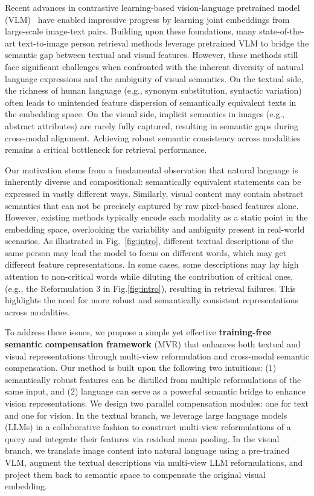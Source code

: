 
Recent advances in contrastive learning-based vision-language pretrained model (VLM)~\cite{radford2021learning, li2022blip} have enabled impressive progress by learning joint embeddings from large-scale image-text pairs. Building upon these foundations, many state-of-the-art text-to-image person retrieval methods \cite{HAM, zuo2024plip, hu2024empowering} leverage pretrained VLM to bridge the semantic gap between textual and visual features. However, these methods still face significant challenges when confronted with the inherent diversity of natural language expressions and the ambiguity of visual semantics. On the textual side, the richness of human language (e.g., synonym substitution, syntactic variation) often leads to unintended feature dispersion of semantically equivalent texts in the embedding space. On the visual side, implicit semantics in images (e.g., abstract attributes) are rarely fully captured, resulting in semantic gaps during cross-modal alignment. Achieving robust semantic consistency across modalities remains a critical bottleneck for retrieval performance.

Our motivation stems from a fundamental observation that natural language is inherently diverse and compositional: semantically equivalent statements can be expressed in vastly different ways. Similarly, visual content may contain abstract semantics that can not be precisely captured by raw pixel-based features alone. However, existing methods typically encode each modality as a static point in the embedding space, overlooking the variability and ambiguity present in real-world scenarios. As illustrated in Fig.~\ref{fig:intro}, different textual descriptions of the same person may lead the model to focus on different words, which may get different feature representations. In some cases, some descriptions may lay high attention to non-critical words while diluting the contribution of critical ones, (e.g., the Reformulation 3 in Fig.\ref{fig:intro}), resulting in retrieval failures. This highlights the need for more robust and semantically consistent representations across modalities.


To address these issues, we propose a simple yet effective \textbf{training-free semantic compensation framework} (MVR) that enhances both textual and visual representations through multi-view reformulation and cross-modal semantic compensation. Our method is built upon the following two intuitions: (1) semantically robust features can be distilled from multiple reformulations of the same input, and (2) language can serve as a powerful semantic bridge to enhance vision representations. We design two parallel compensation modules: one for text and one for vision. 
In the textual branch, we leverage large language models (LLMs) in a collaborative fashion to construct multi-view reformulations of a query and integrate their features via residual mean pooling. In the visual branch, we translate image content into natural language using a pre-trained VLM, augment the textual descriptions via multi-view LLM reformulations, and project them back to semantic space to compensate the original visual embedding. 

